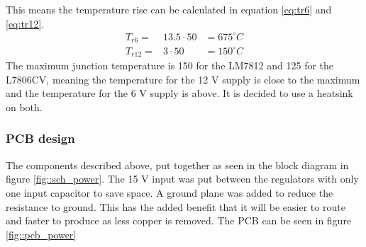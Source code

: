 This means the temperature rise can be calculated in equation \ref{eq:tr6} and \ref{eq:tr12}.
\begin{eqnarray}
T_{r6}  =&  13.5 \cdot 50   &= 675^\circ C \label{eq:tr6}\\
T_{r12} =&  3 \cdot 50      &= 150^\circ C \label{eq:tr12}
\end{eqnarray}
The maximum junction temperature is 150 for the LM7812\cite[p. 3]{ds:LM78XX} and 125 for the L7806CV\cite[p. 7]{ds:L7806CV}, meaning the temperature for the 12 V supply is close to the maximum and the temperature for the 6 V supply is above.
It is decided to use a heatsink on both.

\subsubsection{PCB design}
The components described above, put together as seen in the block diagram in figure \ref{fig::sch_power}. 
The 15 V input was put between the regulators with only one input capacitor to save space.
A ground plane was added to reduce the resistance to ground.
This has the added benefit that it will be easier to route and faster to produce as less copper is removed.
The PCB can be seen in figure \ref{fig::pcb_power}

